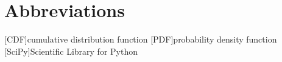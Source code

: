 
\chapter*{Abbreviations}
	\begin{acronym}[SciPy]
		\setlength{\itemsep}{-\parsep}

		[\textup{CDF}]{cumulative distribution function}
		[\textup{PDF}]{probability density function}
		[\textup{SciPy}]{Scientific Library for Python}
	
	\end{acronym}

	
	